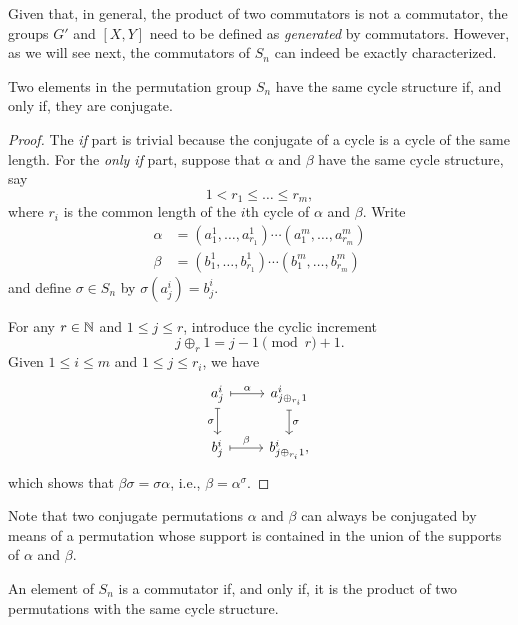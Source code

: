 \begin{rem}
    Given that, in general, the product of two commutators is not a commutator, the groups\/ $G'$ and\/ $[X,Y]$ need to be defined as \textsl{generated\/} by commutators. However, as we will see next, the commutators of\/ $S_n$ can indeed be exactly characterized.
\end{rem}


\begin{lem}
    Two elements in the permutation group $S_n$ have the same cycle structure if, and only if, they are conjugate.
\end{lem}

\begin{proof} The \textit{if\/} part is trivial because the conjugate of a cycle is a cycle of the same length. For the \textit{only if\/} part, suppose that $\alpha$ and $\beta$ have the same cycle structure, say 
$$
    1<r_1\le\dots\le r_m,
$$
where $r_i$ is the common length of the $i$th cycle of $\alpha$ and $\beta$. Write
\begin{align*}
    \alpha &= (a^1_1,\dots,a^1_{r_1})\cdots(a^m_1,\dots,a^m_{r_m})\\
    \beta &= (b^1_1,\dots,b^1_{r_1})\cdots(b^m_1,\dots,b^m_{r_m})
\end{align*}
and define $\sigma\in S_n$ by $\sigma(a^i_j)=b^i_j$.

For any $r \in \mathbb{N}$ and $1\le j\le r$, introduce the cyclic increment
$$
    j\oplus_r1=j-1\pmod r+1.
$$
Given $1\le i\le m$ and $1\le j\le r_i$, we have
$$
    \begin{tikzcd}
        a^i_j
                \arrow[r,"\alpha",mapsto]
                \arrow[d,"\sigma"',mapsto]
            &a^i_{j\oplus_{r_i}1}
                \arrow[d,"\sigma",mapsto]\\
        b^i_j
                \arrow[r,"\beta",mapsto]
            &b^i_{j\oplus_{r_i}1},
    \end{tikzcd}
$$
which shows that $\beta\sigma=\sigma\alpha$, i.e., $\beta=\alpha^\sigma$.
\end{proof}

\begin{rem}
    Note that two conjugate permutations\/ $\alpha$ and\/ $\beta$ can always be conjugated by means of a permutation whose support is contained in the union of the supports of\/ $\alpha$ and\/ $\beta$.
\end{rem}

\begin{lem}
    An element of\/ $S_n$ is a commutator if, and only if, it is the product of two permutations with the same cycle structure.
\end{lem}

